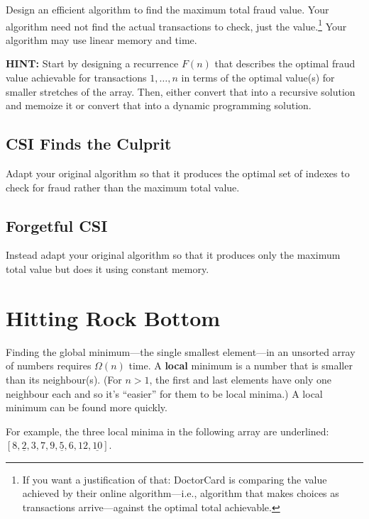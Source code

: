 \documentclass[11pt, oneside]{article}   	%
\theoremstyle{definition}
\theoremstyle{remark}
\begin{document}
Design an efficient algorithm to find the maximum total fraud
value. Your algorithm need not find the actual transactions to check,
just the value.\footnote{If you want a justification of that: DoctorCard is
comparing the value achieved by their online algorithm---i.e.,
algorithm that makes choices as transactions arrive---against the
optimal total achievable.
 } Your algorithm may use linear memory and
time.

\textbf{HINT:} Start by designing a recurrence $F(n)$ that describes the
optimal fraud value achievable for transactions $1,\ldots,n$ in terms
of the optimal value(s) for smaller stretches of the array. Then,
either convert that into a recursive solution and memoize it or
convert that into a dynamic programming solution.
\subsection{CSI Finds the Culprit}
\label{sec-2-1}

Adapt your original algorithm so that it produces the optimal set of indexes to
check for fraud rather than the maximum total value.
\subsection{Forgetful CSI}
\label{sec-2-2}

Instead adapt your original algorithm so that it produces only the
maximum total value but does it using constant memory.
\section{Hitting Rock Bottom}
\label{sec-3}

Finding the global minimum---the single smallest element---in an
unsorted array of numbers requires $\Omega(n)$ time.  A \textbf{local}
minimum is a number that is smaller than its neighbour(s). (For $n>1$,
the first and last elements have only one neighbour each and so it's
``easier'' for them to be local minima.) A local minimum can be found
more quickly.

For example, the three local minima in the following array are
underlined: $[8, \underline{2}, 3, 7, 9, \underline{5}, 6, 12,
\underline{10}]$.
\end{document}
